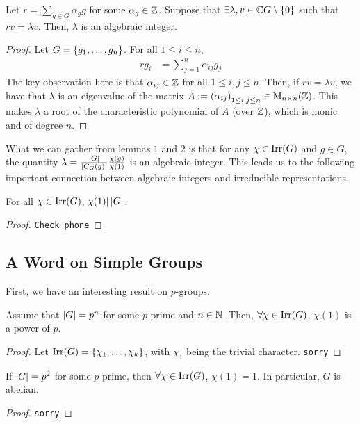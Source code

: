 \begin{lemma}
    Let $r = \sum_{g \in G} \alpha_g g$ for some $\alpha_g \in \mathbb{Z}$. Suppose that $\exists \lambda, v \in \mathbb{C} G \setminus \left\{ 0 \right\}$ such that $rv = \lambda v$. Then, $\lambda$ is an algebraic integer.
\end{lemma}
\begin{proof}
    Let $G = \left\{ g_1, \ldots, g_n \right\}$. For all $1 \leq i \leq n$,
    \begin{align*}
        r g_i &= \sum_{j=1}^{n} \alpha_{ij} g_j
    \end{align*}
    The key observation here is that $\alpha_{ij} \in \mathbb{Z}$ for all $1 \leq i,j \leq n$. %
    Then, if $rv = \lambda v$, we have that $\lambda$ is an eigenvalue of the matrix $A := \left( \alpha_{ij} \right)_{1 \leq i,j \leq n} \in \mathrm{M}_{{n} \times {n}}\!\left( {\mathbb{Z}} \right)$. This makes $\lambda$ a root of the characteristic polynomial of $A$ (over $\mathbb{Z}$), which is monic and of degree $n$.
\end{proof}

What we can gather from lemmas $1$ and $2$ is that for any $\chi \in \operatorname{Irr}\!\left( G \right)$ and $g \in G$, the quantity $\lambda = \frac{\left\lvert G \right\rvert}{\left\lvert C_G(g) \right\rvert} \frac{\chi(g)}{\chi(1)}$ is an algebraic integer. This leads us to the following important connection between algebraic integers and irreducible representations.

\begin{theorem} \label{Ch2:Thm:Char_div_Ord_Grp}
    For all $\chi \in \operatorname{Irr}\!\left( G \right)$, $\chi(1) \vert \left\lvert G \right\rvert$.
\end{theorem}
\begin{proof}
    \verb|Check phone|
\end{proof}

\subsection{A Word on Simple Groups}

First, we have an interesting result on $p$-groups.

\begin{lemma} Assume that $\left\lvert G \right\rvert = p^n$ for some $p$ prime and $n \in \mathbb{N}$. Then, $\forall \chi \in \operatorname{Irr}\!\left( G \right)$, $\chi(1)$ is a power of $p$.
\end{lemma}
\begin{proof}
    Let $\operatorname{Irr}\!\left( G \right) = \left\{ \chi_1, \ldots, \chi_k \right\}$, with $\chi_1$ being the trivial character.
    \verb|sorry|
\end{proof}
\begin{corollary}
    If $\left\lvert G \right\rvert = p^2$ for some $p$ prime, then $\forall \chi \in \operatorname{Irr}\!\left( G \right)$, $\chi(1) = 1$. In particular, $G$ is abelian.
\end{corollary}
\begin{proof}
    \verb|sorry|
\end{proof}

